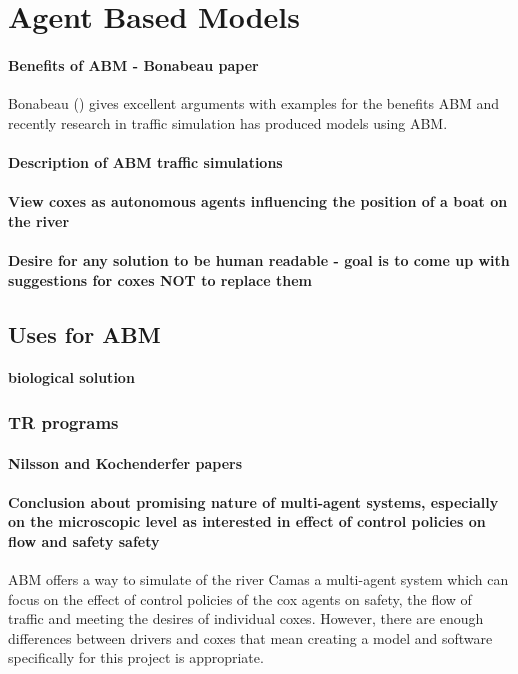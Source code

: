     \section{Agent Based Models}

    \paragraph{Benefits of ABM - Bonabeau paper}
      Bonabeau (\cite{Bonabeau2002}) gives excellent arguments with examples for the benefits ABM and recently research in traffic simulation has produced models using ABM.
      
      \paragraph{Description of ABM traffic simulations}

      \paragraph{View coxes as autonomous agents influencing the position of a boat on the river}
      \paragraph{Desire for any solution to be human readable - goal is to come up with suggestions for coxes NOT to replace them}
      \subsection{Uses for ABM}
        \paragraph{biological solution}
        \subsubsection{TR programs}
          \paragraph{Nilsson and Kochenderfer papers}
          
    \paragraph{Conclusion about promising nature of multi-agent systems, especially on the  microscopic level as interested in effect of control policies on flow and safety safety}
    ABM offers a way to simulate of the river Camas a multi-agent system which can focus on the effect of control policies of the cox agents on safety, the flow of traffic and meeting the desires of individual coxes. However, there are enough differences between drivers and coxes that mean creating a model and software specifically for this project is appropriate.
    
